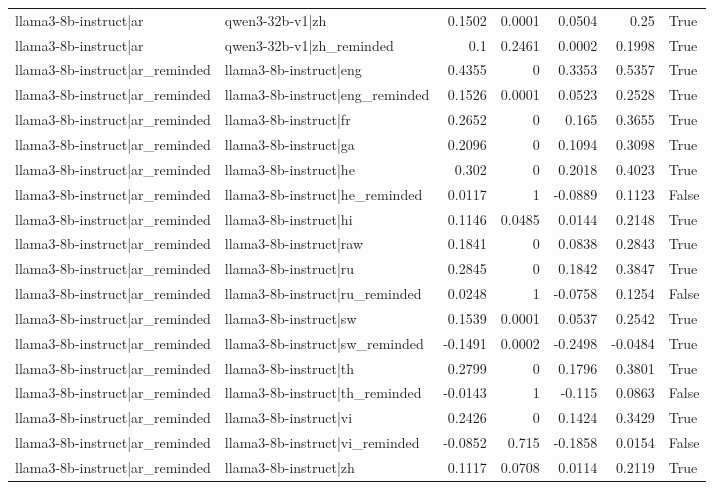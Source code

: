 \begin{table}
\begin{tabular}{l l r r r r l}
llama3-8b-instruct|ar & qwen3-32b-v1|zh & 0.1502 & 0.0001 & 0.0504 & 0.25 & True \\
llama3-8b-instruct|ar & qwen3-32b-v1|zh_reminded & 0.1 & 0.2461 & 0.0002 & 0.1998 & True \\
llama3-8b-instruct|ar_reminded & llama3-8b-instruct|eng & 0.4355 & 0 & 0.3353 & 0.5357 & True \\
llama3-8b-instruct|ar_reminded & llama3-8b-instruct|eng_reminded & 0.1526 & 0.0001 & 0.0523 & 0.2528 & True \\
llama3-8b-instruct|ar_reminded & llama3-8b-instruct|fr & 0.2652 & 0 & 0.165 & 0.3655 & True \\
llama3-8b-instruct|ar_reminded & llama3-8b-instruct|ga & 0.2096 & 0 & 0.1094 & 0.3098 & True \\
llama3-8b-instruct|ar_reminded & llama3-8b-instruct|he & 0.302 & 0 & 0.2018 & 0.4023 & True \\
llama3-8b-instruct|ar_reminded & llama3-8b-instruct|he_reminded & 0.0117 & 1 & -0.0889 & 0.1123 & False \\
llama3-8b-instruct|ar_reminded & llama3-8b-instruct|hi & 0.1146 & 0.0485 & 0.0144 & 0.2148 & True \\
llama3-8b-instruct|ar_reminded & llama3-8b-instruct|raw & 0.1841 & 0 & 0.0838 & 0.2843 & True \\
llama3-8b-instruct|ar_reminded & llama3-8b-instruct|ru & 0.2845 & 0 & 0.1842 & 0.3847 & True \\
llama3-8b-instruct|ar_reminded & llama3-8b-instruct|ru_reminded & 0.0248 & 1 & -0.0758 & 0.1254 & False \\
llama3-8b-instruct|ar_reminded & llama3-8b-instruct|sw & 0.1539 & 0.0001 & 0.0537 & 0.2542 & True \\
llama3-8b-instruct|ar_reminded & llama3-8b-instruct|sw_reminded & -0.1491 & 0.0002 & -0.2498 & -0.0484 & True \\
llama3-8b-instruct|ar_reminded & llama3-8b-instruct|th & 0.2799 & 0 & 0.1796 & 0.3801 & True \\
llama3-8b-instruct|ar_reminded & llama3-8b-instruct|th_reminded & -0.0143 & 1 & -0.115 & 0.0863 & False \\
llama3-8b-instruct|ar_reminded & llama3-8b-instruct|vi & 0.2426 & 0 & 0.1424 & 0.3429 & True \\
llama3-8b-instruct|ar_reminded & llama3-8b-instruct|vi_reminded & -0.0852 & 0.715 & -0.1858 & 0.0154 & False \\
llama3-8b-instruct|ar_reminded & llama3-8b-instruct|zh & 0.1117 & 0.0708 & 0.0114 & 0.2119 & True \\

\end{tabular}
\end{table}
